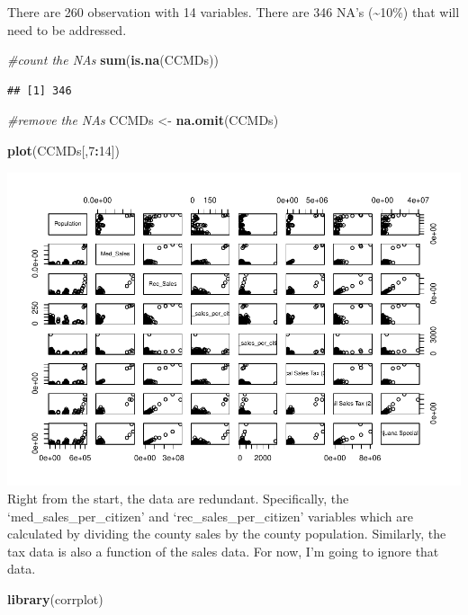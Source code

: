 \documentclass[]{article}
\newenvironment{Shaded}{\begin{snugshade}}{\end{snugshade}}
\newcommand{\CommentTok}[1]{\textcolor[rgb]{0.56,0.35,0.01}{\textit{#1}}}
\newcommand{\DecValTok}[1]{\textcolor[rgb]{0.00,0.00,0.81}{#1}}
\newcommand{\KeywordTok}[1]{\textcolor[rgb]{0.13,0.29,0.53}{\textbf{#1}}}
\newcommand{\NormalTok}[1]{#1}
\newcommand{\OperatorTok}[1]{\textcolor[rgb]{0.81,0.36,0.00}{\textbf{#1}}}
\newcommand{\StringTok}[1]{\textcolor[rgb]{0.31,0.60,0.02}{#1}}
\begin{document}
There are 260 observation with 14 variables. There are 346 NA's
(\textasciitilde{}10\%) that will need to be addressed.

\begin{Shaded}
\begin{Highlighting}[]
\CommentTok{#count the NAs}
\KeywordTok{sum}\NormalTok{(}\KeywordTok{is.na}\NormalTok{(CCMDs))}
\end{Highlighting}
\end{Shaded}

\begin{verbatim}
## [1] 346
\end{verbatim}

\begin{Shaded}
\begin{Highlighting}[]
\CommentTok{#remove the NAs}
\NormalTok{CCMDs <-}\StringTok{ }\KeywordTok{na.omit}\NormalTok{(CCMDs)}

\KeywordTok{plot}\NormalTok{(CCMDs[,}\DecValTok{7}\OperatorTok{:}\DecValTok{14}\NormalTok{])}
\end{Highlighting}
\end{Shaded}

\includegraphics{01-Build_DS_and_EDA_files/figure-latex/unnamed-chunk-4-1.pdf}
Right from the start, the data are redundant. Specifically, the
`med\_sales\_per\_citizen' and `rec\_sales\_per\_citizen' variables
which are calculated by dividing the county sales by the county
population. Similarly, the tax data is also a function of the sales
data. For now, I'm going to ignore that data.

\begin{Shaded}
\begin{Highlighting}[]
\KeywordTok{library}\NormalTok{(corrplot)}
\end{Highlighting}
\end{Shaded}
\end{document}
